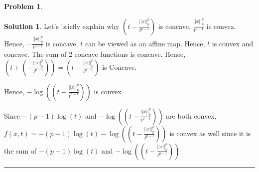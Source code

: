 \documentclass{article}
\theoremstyle{definition}
\newtheorem{problem}{Problem}
\def\fline{\rule{0.75\linewidth}{0.5pt}}
\newcommand{\finishline}{\begin{center}\fline\end{center}}
\newtheorem*{solution*}{Solution}
\newenvironment{solution}{\begin{solution*}}{{\finishline} \end{solution*}}
\begin{document}
\begin{problem}
\begin{itemize}
\begin{solution}
        Let's briefly explain why $(t - \frac{||x||^p_p}{t^{p - 1}})$ is concave. $\frac{||x||^p_p}{t^{p - 1}}$ is convex. Hence, $-\frac{||x||^p_p}{t^{p - 1}}$ is concave. $t$ can be viewed as an affine map. Hence, $t$ is convex and concave. The sum of 2 concave functions is concave. Hence, $(t + (- \frac{||x||^p_p}{t^{p - 1}})) = (t - \frac{||x||^p_p}{t^{p - 1}})$ is Concave. 

        Hence, $- \log((t - \frac{||x||^p_p}{t^{p - 1}}))$ is convex. 

        Since $-(p - 1)\log(t)$ and $- \log((t - \frac{||x||^p_p}{t^{p - 1}}))$ are both convex, $f(x, t) = -(p - 1)\log(t) - \log((t - \frac{||x||^p_p}{t^{p - 1}}))$ is convex as well since it is the sum of $-(p - 1)\log(t)$ and $- \log((t - \frac{||x||^p_p}{t^{p - 1}}))$
    \end{solution}
\end{itemize}
    
\end{problem}
\end{document}
